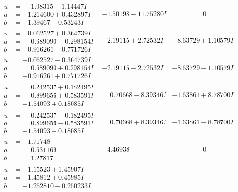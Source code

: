 \documentclass[1p]{elsarticle_modified}
\theoremstyle{definition}
\begin{document}
$$\begin{array}{c|c|c}
\begin{aligned}
u &= \phantom{-}1.08315 - 1.14447 I \\
a &= -1.214600 + 0.432897 I \\
b &= -1.39467 - 0.53243 I\end{aligned}
 & -1.50198 - 11.75280 I & \phantom{-0.000000 } 0 \\ \hline\begin{aligned}
u &= -0.062527 + 0.364739 I \\
a &= \phantom{-}0.689090 - 0.298154 I \\
b &= -0.916261 - 0.771726 I\end{aligned}
 & -2.19115 + 2.72532 I & -8.63729 + 1.10579 I \\ \hline\begin{aligned}
u &= -0.062527 - 0.364739 I \\
a &= \phantom{-}0.689090 + 0.298154 I \\
b &= -0.916261 + 0.771726 I\end{aligned}
 & -2.19115 - 2.72532 I & -8.63729 - 1.10579 I \\ \hline\begin{aligned}
u &= \phantom{-}0.242537 + 0.182495 I \\
a &= \phantom{-}0.899656 + 0.583591 I \\
b &= -1.54093 + 0.18085 I\end{aligned}
 & \phantom{-}0.70668 - 8.39346 I & -1.63861 + 8.78700 I \\ \hline\begin{aligned}
u &= \phantom{-}0.242537 - 0.182495 I \\
a &= \phantom{-}0.899656 - 0.583591 I \\
b &= -1.54093 - 0.18085 I\end{aligned}
 & \phantom{-}0.70668 + 8.39346 I & -1.63861 - 8.78700 I \\ \hline\begin{aligned}
u &= -1.71748\phantom{ +0.000000I} \\
a &= \phantom{-}0.631169\phantom{ +0.000000I} \\
b &= \phantom{-}1.27817\phantom{ +0.000000I}\end{aligned}
 & -4.46938\phantom{ +0.000000I} & \phantom{-0.000000 } 0 \\ \hline\begin{aligned}
u &= -1.15523 + 1.45907 I \\
a &= -1.45812 + 0.45985 I \\
b &= -1.262810 - 0.250233 I\end{aligned}

\end{array}$$
\end{document}
